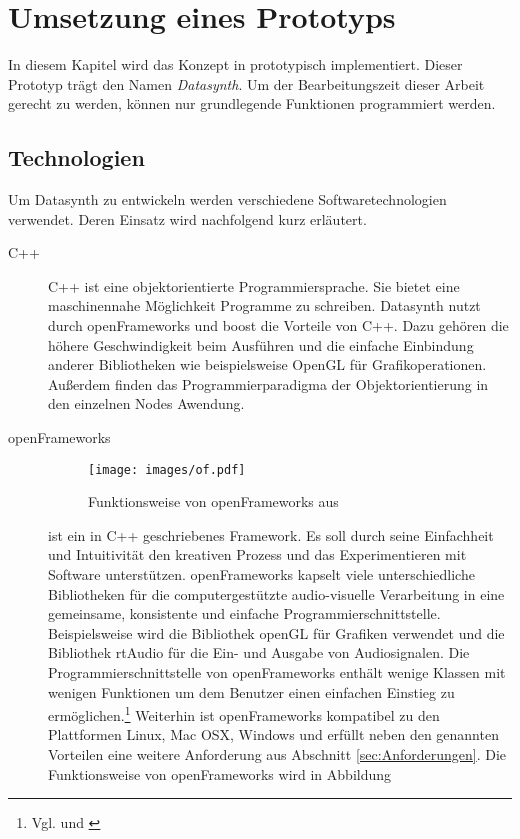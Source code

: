 \documentclass[a4paper, 12pt, DIVcalc, onepage, pdftex, headsepline, footsepline]{scrreprt}
\begin{document}
\chapter{Umsetzung eines Prototyps}
\label{cha:Umsetzung}
In diesem Kapitel wird das Konzept in prototypisch implementiert.
Dieser Prototyp trägt den Namen \textit{Datasynth}.
Um der Bearbeitungszeit dieser Arbeit gerecht zu werden, können nur grundlegende Funktionen
programmiert werden.

\section{Technologien}
\label{sec:Technologien}
Um Datasynth zu entwickeln werden verschiedene Softwaretechnologien verwendet.
Deren Einsatz wird nachfolgend kurz erläutert.
\begin{description}
\item[C++]
C++ ist eine objektorientierte Programmiersprache. Sie bietet
eine maschinennahe Möglichkeit Programme zu schreiben.
Datasynth nutzt durch openFrameworks und boost die Vorteile
von C++. Dazu gehören die höhere Geschwindigkeit beim Ausführen
und die einfache Einbindung anderer Bibliotheken wie 
beispielsweise OpenGL für Grafikoperationen. Außerdem
finden das Programmierparadigma der Objektorientierung
in den einzelnen Nodes Awendung.
\item[openFrameworks]
\begin{figure}
\centering
\texttt{[image: images/of.pdf]}
\caption{Funktionsweise von openFrameworks aus \citep{of_wiki}}
\label{fig:of}
\end{figure}
ist ein in C++ geschriebenes Framework. Es soll durch seine
Einfachheit und Intuitivität den kreativen Prozess und das
Experimentieren mit Software unterstützen. openFrameworks
kapselt viele unterschiedliche Bibliotheken für die
computergestützte audio-visuelle Verarbeitung in eine gemeinsame,
konsistente und einfache Programmierschnittstelle. Beispielsweise
wird die Bibliothek openGL für Grafiken verwendet und die
Bibliothek rtAudio für die Ein- und Ausgabe von Audiosignalen.
Die Programmierschnittstelle von openFrameworks enthält
wenige Klassen mit wenigen Funktionen um dem Benutzer einen
einfachen Einstieg zu ermöglichen.\footnote{Vgl. \citep{of1} und \citep{of2}}
Weiterhin ist openFrameworks kompatibel zu den Plattformen
Linux, Mac OSX, Windows und erfüllt neben den genannten Vorteilen
eine weitere Anforderung aus Abschnitt \ref{sec:Anforderungen}.
Die Funktionsweise von openFrameworks wird in Abbildung

\end{description}
\end{document}
